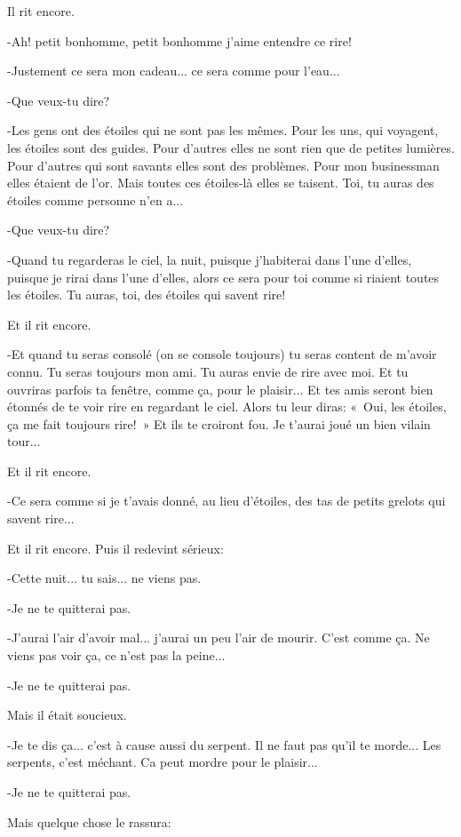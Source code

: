 \documentclass{report}
\begin{document}
\begin{paracol}{2}
Il rit encore.

-Ah! petit bonhomme, petit bonhomme j'aime entendre ce rire!

-Justement ce sera mon cadeau... ce sera comme pour l'eau...

-Que veux-tu dire?

-Les gens ont des étoiles qui ne sont pas les mêmes. Pour les uns, qui voyagent, les étoiles sont des guides. Pour d'autres elles ne sont rien que de petites lumières. Pour d'autres qui sont savants elles sont des problèmes. Pour mon businessman elles étaient de l'or. Mais toutes ces étoiles-là elles se taisent. Toi, tu auras des étoiles comme personne n'en a...

-Que veux-tu dire?

-Quand tu regarderas le ciel, la nuit, puisque j'habiterai dans l'une d'elles, puisque je rirai dans l'une d'elles, alors ce sera pour toi comme si riaient toutes les étoiles. Tu auras, toi, des étoiles qui savent rire!

Et il rit encore.

-Et quand tu seras consolé (on se console toujours) tu seras content de m'avoir connu. Tu seras toujours mon ami. Tu auras envie de rire avec moi. Et tu ouvriras parfois ta fenêtre, comme ça, pour le plaisir... Et tes amis seront bien étonnés de te voir rire en regardant le ciel. Alors tu leur diras: «~Oui, les étoiles, ça me fait toujours rire!~» Et ils te croiront fou. Je t'aurai joué un bien vilain tour...

Et il rit encore.

-Ce sera comme si je t'avais donné, au lieu d'étoiles, des tas de petits grelots qui savent rire...

Et il rit encore. Puis il redevint sérieux:

-Cette nuit... tu sais... ne viens pas.

-Je ne te quitterai pas.

-J'aurai l'air d'avoir mal... j'aurai un peu l'air de mourir. C'est comme ça. Ne viens pas voir ça, ce n'est pas la peine...

-Je ne te quitterai pas.

Mais il était soucieux.

-Je te dis ça... c'est à cause aussi du serpent. Il ne faut pas qu'il te morde... Les serpents, c'est méchant. Ca peut mordre pour le plaisir...

-Je ne te quitterai pas.

Mais quelque chose le rassura:


\end{paracol}
\end{document}
